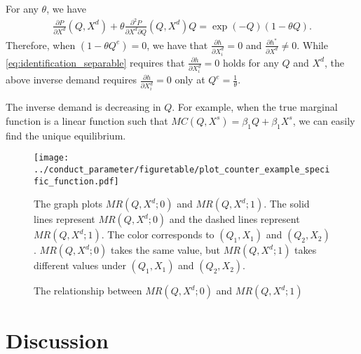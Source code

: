 \documentclass[11pt, a4paper]{article}
\theoremstyle{remark}
\begin{document}
For any $\theta$, we have
\begin{align}
    \frac{\partial P}{\partial X^{d}}(Q, X^{d}) + \theta \frac{\partial^2 P}{\partial X^{d}\partial Q}(Q, X^{d})Q  = \exp(-Q) (1 - \theta Q).
\end{align}
Therefore, when $(1 - \theta Q^e) = 0$, we have that $\frac{\partial h}{\partial X_{i}^d} = 0$ and $\frac{\partial h^{*}}{\partial X^d} \ne 0$.
While \eqref{eq:identification_separable} requires that $\frac{\partial h}{\partial X_{i}^d} =0$ holds for any $Q$ and $X^{d}$, the above inverse demand requires $\frac{\partial h}{\partial X_{i}^d}  = 0$ only at $Q^e = \frac{1}{\theta}$.

The inverse demand is decreasing in $Q$.
For example, when the true marginal function is a linear function such that $MC(Q, X^{s}) = \beta_1 Q + \beta_1X^s$, we can easily find the unique equilibrium.




\begin{figure}[th]
    \begin{center}
        \texttt{[image: ../conduct\_parameter/figuretable/plot\_counter\_example\_specific\_function.pdf]}
        \caption{The relationship between $MR(Q,X^{d};0)$ and $MR(Q,X^{d};1)$}
        \label{fig:counterxample_demand_curves_specific_function}
    \end{center}
    The graph plots $MR(Q,X^{d};0)$ and $MR(Q,X^{d};1)$.
    The solid lines represent $MR(Q,X^{d};0)$ and the dashed lines represent $MR(Q,X^{d};1)$.
    The color corresponds to $(Q_1, X_1)$ and $(Q_2, X_2)$.
    $MR(Q,X^{d};0)$ takes the same value, but $MR(Q,X^{d};1)$ takes different values under $(Q_1, X_1)$ and $(Q_2, X_2)$.
\end{figure}
    





























\fi

\section{Discussion}
\end{document}
